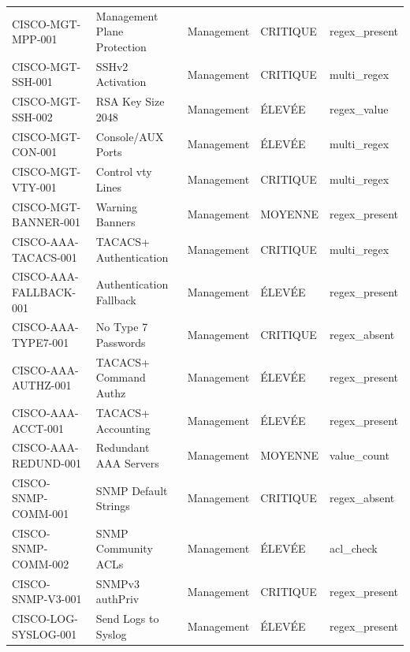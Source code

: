 \documentclass[12pt, a4paper]{report}
\begin{document}
\begin{longtable}{>{\small}p{3.8cm} >{\small}p{3cm} >{\small}p{2cm} >{\small}p{2cm} >{\small}p{2.5cm}}
  \rowcolor{tableRowA} CISCO-MGT-MPP-001 & Management Plane Protection & Management & \textcolor{accentRed}{CRITIQUE} & regex\_present \\
  \rowcolor{tableRowB} CISCO-MGT-SSH-001 & SSHv2 Activation & Management & \textcolor{accentRed}{CRITIQUE} & multi\_regex \\
  \rowcolor{tableRowA} CISCO-MGT-SSH-002 & RSA Key Size 2048 & Management & \textcolor{accentOrange}{ÉLEVÉE} & regex\_value \\
  \rowcolor{tableRowB} CISCO-MGT-CON-001 & Console/AUX Ports & Management & \textcolor{accentOrange}{ÉLEVÉE} & multi\_regex \\
  \rowcolor{tableRowA} CISCO-MGT-VTY-001 & Control vty Lines & Management & \textcolor{accentRed}{CRITIQUE} & multi\_regex \\
  \rowcolor{tableRowB} CISCO-MGT-BANNER-001 & Warning Banners & Management & \textcolor{accentGreen}{MOYENNE} & regex\_present \\
  \rowcolor{tableRowA} CISCO-AAA-TACACS-001 & TACACS+ Authentication & Management & \textcolor{accentRed}{CRITIQUE} & multi\_regex \\
  \rowcolor{tableRowB} CISCO-AAA-FALLBACK-001 & Authentication Fallback & Management & \textcolor{accentOrange}{ÉLEVÉE} & regex\_present \\
  \rowcolor{tableRowA} CISCO-AAA-TYPE7-001 & No Type 7 Passwords & Management & \textcolor{accentRed}{CRITIQUE} & regex\_absent \\
  \rowcolor{tableRowB} CISCO-AAA-AUTHZ-001 & TACACS+ Command Authz & Management & \textcolor{accentOrange}{ÉLEVÉE} & regex\_present \\
  \rowcolor{tableRowA} CISCO-AAA-ACCT-001 & TACACS+ Accounting & Management & \textcolor{accentOrange}{ÉLEVÉE} & regex\_present \\
  \rowcolor{tableRowB} CISCO-AAA-REDUND-001 & Redundant AAA Servers & Management & \textcolor{accentGreen}{MOYENNE} & value\_count \\
  \rowcolor{tableRowA} CISCO-SNMP-COMM-001 & SNMP Default Strings & Management & \textcolor{accentRed}{CRITIQUE} & regex\_absent \\
  \rowcolor{tableRowB} CISCO-SNMP-COMM-002 & SNMP Community ACLs & Management & \textcolor{accentOrange}{ÉLEVÉE} & acl\_check \\
  \rowcolor{tableRowA} CISCO-SNMP-V3-001 & SNMPv3 authPriv & Management & \textcolor{accentRed}{CRITIQUE} & regex\_present \\
  \rowcolor{tableRowB} CISCO-LOG-SYSLOG-001 & Send Logs to Syslog & Management & \textcolor{accentOrange}{ÉLEVÉE} & regex\_present \\

\end{longtable}
\end{document}
